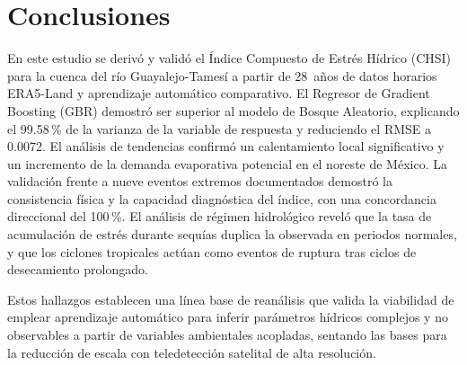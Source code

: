 \documentclass[12pt, a4paper]{article}
\begin{document}
\section{Conclusiones}
\label{sec:conclusiones}

En este estudio se derivó y validó el Índice Compuesto de Estrés Hídrico (CHSI) para la cuenca del río Guayalejo-Tamesí a partir de 28~años de datos horarios ERA5-Land y aprendizaje automático comparativo. El Regresor de Gradient Boosting (GBR) demostró ser superior al modelo de Bosque Aleatorio, explicando el 99.58\,\% de la varianza de la variable de respuesta y reduciendo el RMSE a 0.0072. El análisis de tendencias confirmó un calentamiento local significativo y un incremento de la demanda evaporativa potencial en el noreste de México. La validación frente a nueve eventos extremos documentados demostró la consistencia física y la capacidad diagnóstica del índice, con una concordancia direccional del 100\,\%. El análisis de régimen hidrológico reveló que la tasa de acumulación de estrés durante sequías duplica la observada en periodos normales, y que los ciclones tropicales actúan como eventos de ruptura tras ciclos de desecamiento prolongado.

Estos hallazgos establecen una línea base de reanálisis que valida la viabilidad de emplear aprendizaje automático para inferir parámetros hídricos complejos y no observables a partir de variables ambientales acopladas, sentando las bases para la reducción de escala con teledetección satelital de alta resolución.

\newpage
\printbibliography[title={Referencias}]
\end{document}

